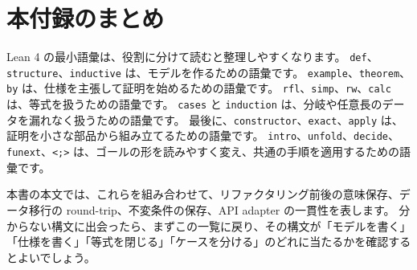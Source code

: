 \section{本付録のまとめ}

Lean 4 の最小語彙は、役割に分けて読むと整理しやすくなります。
\texttt{def}、\texttt{structure}、\texttt{inductive} は、モデルを作るための語彙です。
\texttt{example}、\texttt{theorem}、\texttt{by} は、仕様を主張して証明を始めるための語彙です。
\texttt{rfl}、\texttt{simp}、\texttt{rw}、\texttt{calc} は、等式を扱うための語彙です。
\texttt{cases} と \texttt{induction} は、分岐や任意長のデータを漏れなく扱うための語彙です。
最後に、\texttt{constructor}、\texttt{exact}、\texttt{apply} は、証明を小さな部品から組み立てるための語彙です。
\texttt{intro}、\texttt{unfold}、\texttt{decide}、\texttt{funext}、\texttt{<;>} は、ゴールの形を読みやすく変え、共通の手順を適用するための語彙です。

本書の本文では、これらを組み合わせて、リファクタリング前後の意味保存、データ移行の round-trip、不変条件の保存、API adapter の一貫性を表します。
分からない構文に出会ったら、まずこの一覧に戻り、その構文が「モデルを書く」「仕様を書く」「等式を閉じる」「ケースを分ける」のどれに当たるかを確認するとよいでしょう。
